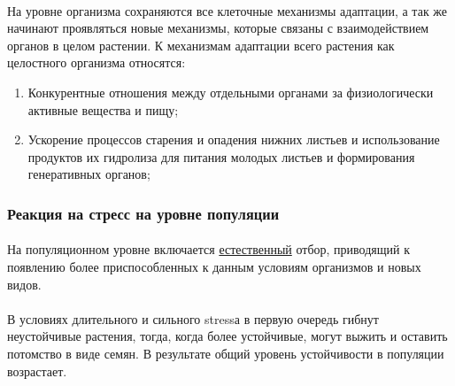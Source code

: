 \paragraph*{}На уровне организма сохраняются все клеточные механизмы адаптации, а так же начинают проявляться новые механизмы, которые связаны с взаимодействием органов в целом растении. К механизмам адаптации всего растения как целостного организма относятся:

\begin{enumerate}
	\item Конкурентные отношения между отдельными органами за физиологически активные вещества и пищу;


	\item Ускорение процессов старения и опадения нижних листьев и использование продуктов их гидролиза для питания молодых листьев и формирования генеративных органов;

\end{enumerate}

\subsubsection*{Реакция на стресс на уровне популяции}


\paragraph*{}На популяционном уровне включается \hyperlink{naturel_selection_quest}{естественный} отбор, приводящий к появлению более приспособленных к данным условиям организмов и новых видов. 

\paragraph*{}В условиях длительного и сильного \gls{stress}а в первую очередь гибнут неустойчивые растения, тогда, когда более устойчивые, могут выжить и оставить потомство в виде семян. В результате общий уровень устойчивости в популяции возрастает. 

